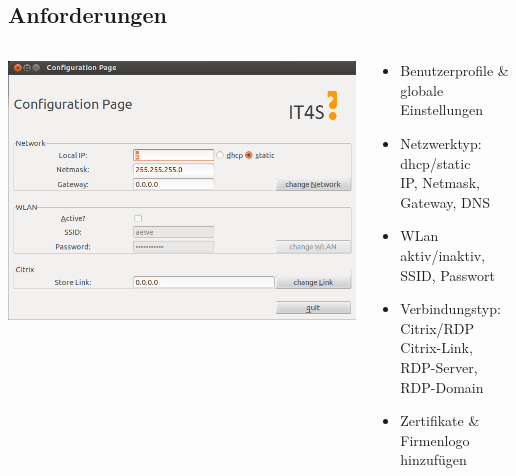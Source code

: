 \documentclass{beamer}
\begin{document}
\subsection*{Anforderungen}
	\begin{frame}
		\begin{center}
			\begin{columns}
				\begin{column}{.60\linewidth}
					\centering
					\includegraphics[scale=0.30]{gtk_oberflaeche}\\
				\end{column}
				\begin{column}{.4\linewidth}
					\vspace{5em}
					\begin{itemize}
						\item 	Benutzerprofile \& globale Einstellungen\\

						\item Netzwerktyp: dhcp/static\\
							IP, Netmask, Gateway, DNS 
							\vspace{1em}
						\item WLan aktiv/inaktiv, \\SSID, Passwort
							\vspace{1em}

						\item Verbindungstyp: Citrix/RDP\\
							Citrix-Link, RDP-Server, RDP-Domain

						\item Zertifikate \& Firmenlogo hinzufügen
					\end{itemize}
				\end{column}
			\end{columns}
		\end{center} 
	\end{frame}
\end{document}
